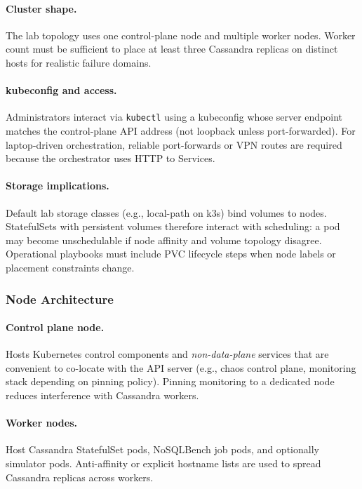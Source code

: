 \documentclass[sigconf]{acmart}
\begin{document}
\paragraph{Cluster shape.}
The lab topology uses one control-plane node and multiple worker nodes. Worker count must be sufficient to place at least three Cassandra replicas on distinct hosts for realistic failure domains.

\paragraph{kubeconfig and access.}
Administrators interact via \texttt{kubectl} using a kubeconfig whose server endpoint matches the control-plane API address (not loopback unless port-forwarded). For laptop-driven orchestration, reliable port-forwards or VPN routes are required because the orchestrator uses HTTP to Services.

\paragraph{Storage implications.}
Default lab storage classes (e.g., local-path on k3s) bind volumes to nodes. StatefulSets with persistent volumes therefore interact with scheduling: a pod may become unschedulable if node affinity and volume topology disagree. Operational playbooks must include PVC lifecycle steps when node labels or placement constraints change.

%
\subsubsection{Node Architecture}
\label{subsubsec:node-arch}

\paragraph{Control plane node.}
Hosts Kubernetes control components and \emph{non-data-plane} services that are convenient to co-locate with the API server (e.g., chaos control plane, monitoring stack depending on pinning policy). Pinning monitoring to a dedicated node reduces interference with Cassandra workers.

\paragraph{Worker nodes.}
Host Cassandra StatefulSet pods, NoSQLBench job pods, and optionally simulator pods. Anti-affinity or explicit hostname lists are used to spread Cassandra replicas across workers.
\end{document}
